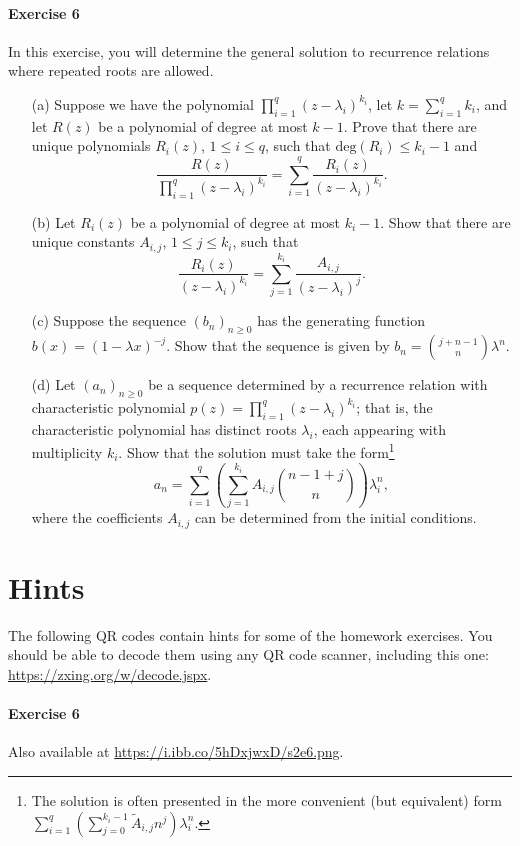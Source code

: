 \documentclass[a4paper,12pt]{article}
\renewcommand{\deg}{\textrm{deg}}
\begin{document}
\paragraph{Exercise 6}  In this exercise, you will determine the general solution to recurrence relations where repeated roots are allowed.

\begin{itemize}
	\item[(a)] Suppose we have the polynomial $\prod_{i=1}^q \left( z - \lambda_i \right)^{k_i}$, let $k = \sum_{i=1}^q k_i$, and let $R(z)$ be a polynomial of degree at most $k-1$. Prove that there are unique polynomials $R_i(z)$, $1 \le i \le q$, such that $\deg(R_i) \le k_i - 1$ and 
\[ \frac{R(z)}{\prod_{i=1}^q ( z - \lambda_i )^{k_i}} = \sum_{i=1}^q \frac{R_i(z)}{ (z - \lambda_i )^{k_i} }. \]
	\item[(b)] Let $R_i(z)$ be a polynomial of degree at most $k_i - 1$. Show that there are unique constants $A_{i,j}$, $1 \le j \le k_i$, such that
\[ \frac{R_i(z)}{(z - \lambda_i)^{k_i}} = \sum_{j=1}^{k_i} \frac{A_{i,j}}{(z - \lambda_i)^j}. \]
	\item[(c)] Suppose the sequence $(b_n)_{n \ge 0}$ has the generating function $b(x) = (1 - \lambda x)^{-j}$.  Show that the sequence is given by $b_n = \binom{j + n - 1}{n} \lambda^n$.
	\item[(d)] Let $(a_n)_{n \ge 0}$ be a sequence determined by a recurrence relation with characteristic polynomial $p(z) = \prod_{i = 1}^q (z - \lambda_i)^{k_i}$; that is, the characteristic polynomial has distinct roots $\lambda_i$, each appearing with multiplicity $k_i$.  Show that the solution must take the form\footnote{The solution is often presented in the more convenient (but equivalent) form $\sum_{i=1}^q \left( \sum_{j=0}^{k_i - 1} \tilde{A}_{i,j} n^{j} \right) \lambda_i^n$.}
\[ a_n = \sum_{i=1}^q \left( \sum_{j = 1}^{k_i} A_{i,j} \binom{n-1+j}{n} \right) \lambda_i^n, \]
where the coefficients $A_{i,j}$ can be determined from the initial conditions.
\end{itemize}

\newpage

\section*{Hints}  The following QR codes contain hints for some of the homework exercises.  You should be able to decode them using any QR code scanner, including this one: \url{https://zxing.org/w/decode.jspx}.

\paragraph{Exercise 6} Also available at \url{https://i.ibb.co/5hDxjwxD/s2e6.png}.

\end{document}
